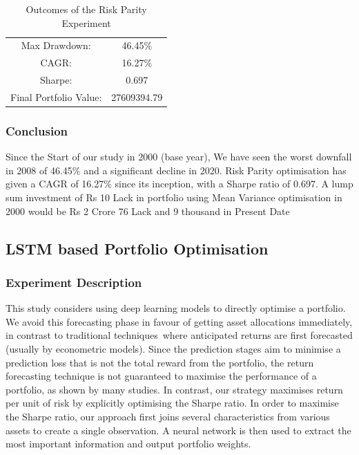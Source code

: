 \begin{table}[H]
\centering
\begin{tabular}{|c | c|} 
 \hline
 Max Drawdown: &46.45\%\\
CAGR: &16.27\%\\
Sharpe: &0.697\\
Final Portfolio Value: &27609394.79\\

 \hline
\end{tabular}
\caption{Outcomes of the Risk Parity Experiment}
\label{RP outcome table}
\end{table}
\subsubsection{Conclusion}
Since the Start of our study in 2000 (base year), We have seen the worst downfall in 2008 of 46.45\% and a significant decline in 2020. Risk Parity optimisation has given a CAGR of 16.27\% since its inception, with a Sharpe ratio of 0.697. A lump sum investment of Rs 10 Lack in portfolio using Mean Variance optimisation in 2000 would be Rs 2 Crore 76 Lack and 9 thousand in Present Date

\subsection{LSTM based Portfolio Optimisation}
\subsubsection{Experiment Description}
This study considers using deep learning models to directly optimise a portfolio.  We avoid this forecasting phase in favour of getting asset allocations immediately, in contrast to traditional techniques where anticipated returns are first forecasted (usually by econometric models). Since the prediction stages aim to minimise a prediction loss that is not the total reward from the portfolio, the return forecasting technique is not guaranteed to maximise the performance of a portfolio, as shown by many studies. In contrast, our strategy maximises return per unit of risk by explicitly optimising the Sharpe ratio. In order to maximise the Sharpe ratio, our approach first joins several characteristics from various assets to create a single observation. A neural network is then used to extract the most important information and output portfolio weights.

